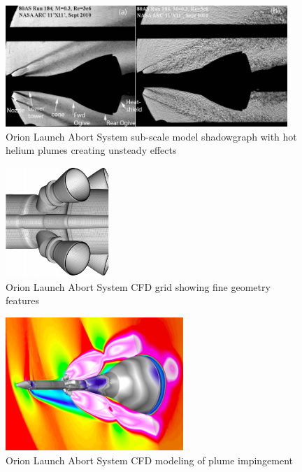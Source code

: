 \documentclass[]{aiaa-tc}%
\begin{document}
\begin{figure}[htb]
\begin{center}
\includegraphics[width=0.95\textwidth]{Images/SLS_WTT_Abort_Shadowgraph.png}
\caption{Orion Launch Abort System sub-scale model shadowgraph with hot helium plumes creating unsteady effects \cite{HeatedHeliumWTT}}
\label{SLSWTTAbortshadowgraph}
\end{center}
\end{figure}

\begin{figure}[htb]
\begin{center}
\includegraphics[width=0.35\textwidth]{Images/LAS_Grid.png}
\caption{Orion Launch Abort System CFD grid showing fine geometry features \cite{OrionAbortPlumesControllability}}
\label{LASgrid}
\end{center}
\end{figure}

\begin{figure}[htb]
\begin{center}
\includegraphics[width=0.6\textwidth]{Images/LAS_CFD.png}
\caption{Orion Launch Abort System CFD modeling of plume impingement \cite{OrionAbortPlumesControllability}}
\label{LASCFD}
\end{center}
\end{figure}
\end{document}
